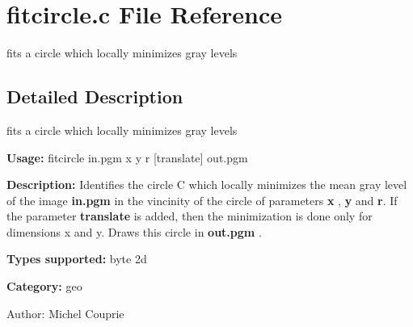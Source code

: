 \section{fitcircle.c File Reference}
\label{fitcircle_8c}
fits a circle which locally minimizes gray levels  




\label{_details}
\subsection{Detailed Description}
fits a circle which locally minimizes gray levels 

{\bf Usage:} fitcircle in.pgm x y r [translate] out.pgm

{\bf Description:} Identifies the circle C which locally minimizes the mean gray level of the image {\bf in.pgm} in the vincinity of the circle of parameters {\bf x} , {\bf y} and {\bf r}. If the parameter {\bf translate} is added, then the minimization is done only for dimensions x and y. Draws this circle in {\bf out.pgm} .

{\bf Types supported:} byte 2d

{\bf Category:} geo

\begin{Desc}
\item[Author:]Michel Couprie \end{Desc}
